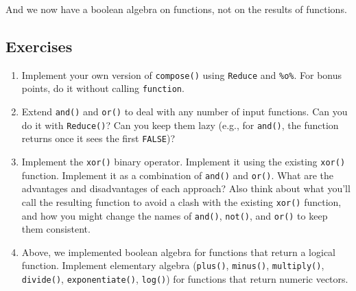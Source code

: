 And we now have a boolean algebra on functions, not on the results of
functions. 

\hypertarget{exercises-3}{%
\subsection{Exercises}\label{exercises-3}}

\begin{enumerate}
\def\labelenumi{\arabic{enumi}.}
\item
  Implement your own version of \texttt{compose()} using \texttt{Reduce}
  and \texttt{\%o\%}. For bonus points, do it without calling
  \texttt{function}.
\item
  Extend \texttt{and()} and \texttt{or()} to deal with any number of
  input functions. Can you do it with \texttt{Reduce()}? Can you keep
  them lazy (e.g., for \texttt{and()}, the function returns once it sees
  the first \texttt{FALSE})?
\item
  Implement the \texttt{xor()} binary operator. Implement it using the
  existing \texttt{xor()} function. Implement it as a combination of
  \texttt{and()} and \texttt{or()}. What are the advantages and
  disadvantages of each approach? Also think about what you'll call the
  resulting function to avoid a clash with the existing \texttt{xor()}
  function, and how you might change the names of \texttt{and()},
  \texttt{not()}, and \texttt{or()} to keep them consistent.
\item
  Above, we implemented boolean algebra for functions that return a
  logical function. Implement elementary algebra (\texttt{plus()},
  \texttt{minus()}, \texttt{multiply()}, \texttt{divide()},
  \texttt{exponentiate()}, \texttt{log()}) for functions that return
  numeric vectors.
\end{enumerate}
